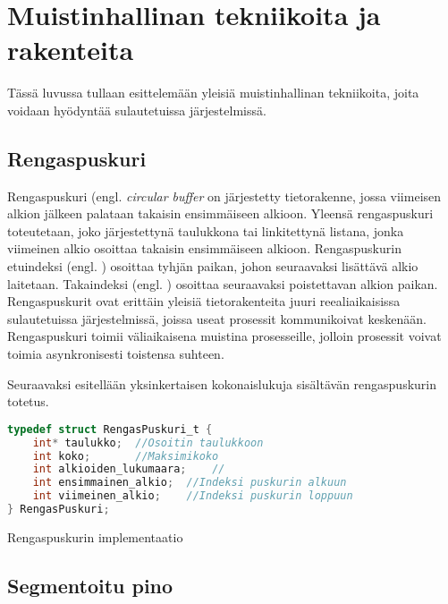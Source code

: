 \chapter{Muistinhallinan tekniikoita ja rakenteita} \label{Neljäs luku}

Tässä luvussa tullaan esittelemään yleisiä muistinhallinan tekniikoita, joita voidaan hyödyntää sulautetuissa järjestelmissä.

\section{Rengaspuskuri}

Rengaspuskuri (engl. \textit{circular buffer} on järjestetty tietorakenne, jossa viimeisen alkion jälkeen palataan takaisin ensimmäiseen alkioon. Yleensä rengaspuskuri toteutetaan, joko järjestettynä taulukkona tai linkitettynä listana, jonka viimeinen alkio osoittaa takaisin ensimmäiseen alkioon. Rengaspuskurin etuindeksi (engl. ) osoittaa tyhjän paikan, johon seuraavaksi lisättävä alkio laitetaan. Takaindeksi (engl. ) osoittaa seuraavaksi poistettavan alkion paikan. Rengaspuskurit ovat erittäin yleisiä tietorakenteita juuri reealiaikaisissa sulautetuissa järjestelmissä, joissa useat prosessit kommunikoivat keskenään. Rengaspuskuri toimii väliaikaisena muistina prosesseille, jolloin prosessit voivat toimia asynkronisesti toistensa suhteen.\cite{c2015book}

Seuraavaksi esitellään yksinkertaisen kokonaislukuja sisältävän rengaspuskurin totetus.

\begin{algorithm}[tbh]
\begin{lstlisting}[language=C]
typedef struct RengasPuskuri_t {
    int* taulukko;  //Osoitin taulukkoon
    int koko;       //Maksimikoko
    int alkioiden_lukumaara;    //
    int ensimmainen_alkio;  //Indeksi puskurin alkuun
    int viimeinen_alkio;    //Indeksi puskurin loppuun
} RengasPuskuri;
\end{lstlisting}
\caption{Rengaspuskurin implementaatio\label{alg:Rengaspuskuri}}
\end{algorithm}

\section{Segmentoitu pino}

